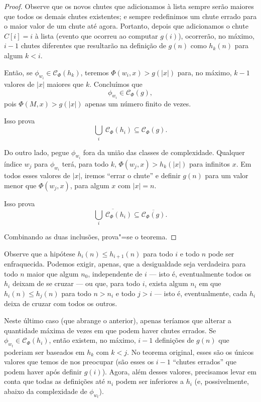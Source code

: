 \begin{proof}
    Observe que os novos chutes que adicionamos à lista
    sempre serão maiores que todos os demais chutes existentes;
    e sempre redefinimos um chute errado
    para o maior valor de um chute até agora.
    Portanto, depois que adicionamos o chute
    $C[i] = i$ à lista
    (evento que ocorreu ao computar $g(i)$),
    ocorrerão, no máximo,
    $i-1$ chutes diferentes
    que resultarão na definição de $g(n)$ como $h_k(n)$
    para algum $k < i$.

    Então, se $\phi_{w_i} \in \mathcal C_\Phi(h_k)$,
    teremos $\Phi(w_i, x) > g(|x|)$
    para, no máximo, $k-1$ valores de $|x|$ maiores que $k$.
    Concluímos que
    \begin{equation*}
        \phi_{w_i} \in \mathcal C_\Phi(g),
    \end{equation*}
    pois $\Phi(M, x) > g(|x|)$ apenas um número finito de vezes.

    Isso prova
    \begin{equation*}
        \bigcup_i \ \mathcal C_\Phi(h_i) \subseteq \mathcal C_\Phi(g).
    \end{equation*}

    Do outro lado,
    pegue $\phi_{w_i}$ fora da união das classes de complexidade.
    Qualquer índice $w_j$ para $\phi_{w_i}$
    terá, para todo $k$,
    $\Phi(w_j, x) > h_k(|x|)$ para infinitos $x$.
    Em todos esses valores de $|x|$,
    iremos ``errar o chute''
    e definir $g(n)$
    para um valor menor que $\Phi(w_j, x)$,
    para algum $x$ com $|x| = n$.

    Isso prova
    \begin{equation*}
        \overline{\bigcup_i \ \mathcal C_\Phi(h_i)}
        \subseteq \overline{\mathcal C_\Phi(g)}.
    \end{equation*}

    Combinando as duas inclusões, prova"=se o teorema.
\end{proof}

Observe que a hipótese $h_i(n) \leq h_{i+1}(n)$
para todo $i$ e todo $n$
pode ser enfraquecida.
Podemos exigir, apenas,
que a desigualdade seja verdadeira para todo $n$
maior que algum $n_0$,
independente de $i$
--- isto é, eventualmente todos os $h_i$
deixam de se cruzar
---
ou que, para todo $i$,
exista algum $n_i$ em que
$h_i(n) \leq h_j(n)$ para todo $n > n_i$
e todo $j > i$
--- isto é, eventualmente,
cada $h_i$ deixa de cruzar com todos os outros.

Neste último caso
(que abrange o anterior),
apenas teríamos que alterar a quantidade máxima de vezes
em que podem haver chutes errados.
Se $\phi_{w_t} \in \mathcal C_\Phi(h_i)$,
então existem, no máximo,
$i - 1$ definições de $g(n)$
que poderiam ser baseados em $h_k$
com $k < j$.
No teorema original,
esses são os únicos valores que temos de nos preocupar
(são esses os $i-1$ ``chutes errados'' que podem haver
após definir $g(i)$).
Agora, além desses valores,
precisamos levar em conta que
todas as definições até $n_i$
podem ser inferiores a $h_i$
(e, possivelmente, abaixo da complexidade de $\phi_{w_t}$).

